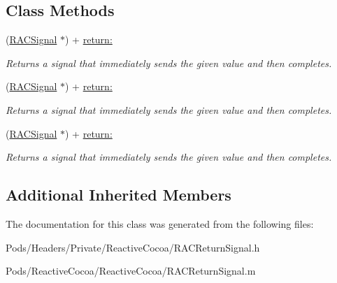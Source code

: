 \subsection*{Class Methods}
\begin{DoxyCompactItemize}
\item 
\mbox{\label{interface_r_a_c_return_signal_acaf96978eeb78adb2409b717f26ce665}} 
(\mbox{\hyperlink{interface_r_a_c_signal}{R\+A\+C\+Signal}} $\ast$) + \mbox{\hyperlink{interface_r_a_c_return_signal_acaf96978eeb78adb2409b717f26ce665}{return\+:}}
\begin{DoxyCompactList}\small\item\em Returns a signal that immediately sends the given value and then completes. \end{DoxyCompactList}\item 
\mbox{\label{interface_r_a_c_return_signal_acaf96978eeb78adb2409b717f26ce665}} 
(\mbox{\hyperlink{interface_r_a_c_signal}{R\+A\+C\+Signal}} $\ast$) + \mbox{\hyperlink{interface_r_a_c_return_signal_acaf96978eeb78adb2409b717f26ce665}{return\+:}}
\begin{DoxyCompactList}\small\item\em Returns a signal that immediately sends the given value and then completes. \end{DoxyCompactList}\item 
\mbox{\label{interface_r_a_c_return_signal_acaf96978eeb78adb2409b717f26ce665}} 
(\mbox{\hyperlink{interface_r_a_c_signal}{R\+A\+C\+Signal}} $\ast$) + \mbox{\hyperlink{interface_r_a_c_return_signal_acaf96978eeb78adb2409b717f26ce665}{return\+:}}
\begin{DoxyCompactList}\small\item\em Returns a signal that immediately sends the given value and then completes. \end{DoxyCompactList}\end{DoxyCompactItemize}
\subsection*{Additional Inherited Members}


The documentation for this class was generated from the following files\+:\begin{DoxyCompactItemize}
\item 
Pods/\+Headers/\+Private/\+Reactive\+Cocoa/R\+A\+C\+Return\+Signal.\+h\item 
Pods/\+Reactive\+Cocoa/\+Reactive\+Cocoa/R\+A\+C\+Return\+Signal.\+m\end{DoxyCompactItemize}
